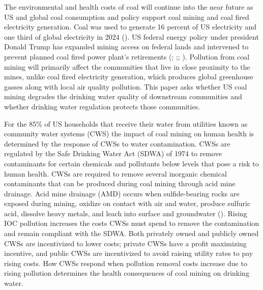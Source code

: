 \documentclass{article}
\begin{document}
The environmental and health costs of coal will continue into the near future as US and global coal consumption and policy support coal mining and coal fired electricity generation. Coal was used to generate 16 percent of US electricity and one third of global electricity in 2024 (\cite{IEA2025GER}). US federal energy policy under president Donald Trump has expanded mining access on federal lands and intervened to prevent planned coal fired power plant's retirements (\cite{Trump2025EO14260}; \cite{Trump2025EO14261};\cite{Trump2025Proc10914}; \cite{Daly2025CoalMining}). Pollution from coal mining will primarily affect the communities that live in close proximity to the mines, unlike coal fired electricity generation, which produces global greenhouse gasses along with local air quality pollution. This paper asks whether US coal mining degrades the drinking water quality of downstream communities and whether drinking water regulation protects those communities.

For the 85\% of US households that receive their water from utilities known as community water systems (CWS) the impact of coal mining on human health is determined by the response of CWSs to water contamination. CWSs are regulated by the Safe Drinking Water Act (SDWA) of 1974 to remove contaminants for certain chemicals and pollutants below levels that pose a risk to human health. CWSs are required to remove several inorganic chemical contaminants that can be produced during coal mining through acid mine drainage. Acid mine drainage (AMD) occurs when sulfide-bearing rocks are exposed during mining, oxidize on contact with air and water, produce sulfuric acid, dissolve heavy metals, and leach into surface and groundwater (\cite{skousen2019acid}). Rising IOC pollution increases the costs CWSs must spend to remove the contamination and remain compliant with the SDWA. Both privately owned and publicly owned CWSs are incentivized to lower costs; private CWSs have a profit maximizing incentive, and public CWSs are incentivized to avoid raising utility rates to pay rising costs. How CWSs respond when pollution removal costs increase due to rising pollution determines the health consequences of coal mining on drinking water.
\end{document}

